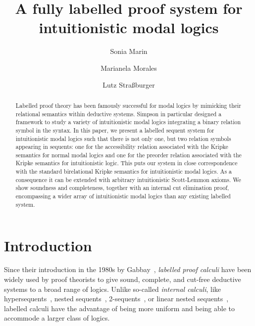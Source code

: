 \documentclass[a4paper]{article}
\title{A fully labelled proof system for intuitionistic modal logics}
\author[1]{Sonia Marin}
\author[2,3]{Marianela Morales}
\author[3,2]{Lutz Stra{\ss}burger}
\affil[1]{University College London}
\affil[2]{Laboratoire d'Informatique de l'\'Ecole Polytechnique}
\affil[3]{Inria Saclay}
\date{}
\begin{document}
  \maketitle
  
 \begin{abstract}
   Labelled proof theory has been famously successful for modal logics by mimicking their relational semantics within deductive systems. Simpson in particular designed a framework to study a variety of intuitionistic modal logics integrating a binary relation symbol in the syntax.
   In this paper, we present a labelled sequent system for
   intuitionistic modal logics such that there is not only one, but
   two relation symbols appearing in sequents: one for the accessibility
   relation associated with the Kripke semantics for normal modal logics and
   one for the preorder relation associated with the Kripke semantics
   for intuitionistic logic.
   This puts our system in close correspondence with the standard
   birelational Kripke semantics for intuitionistic modal logics. 
   As a consequence it can be extended with arbitrary intuitionistic Scott-Lemmon axioms. 
   We show soundness and completeness, together with an internal cut elimination proof, encompassing a wider array of intuitionistic modal logics than any existing labelled system.
 \end{abstract}
 
 \section{Introduction}\label{sec:intro}
 
 Since their introduction in the 1980s by Gabbay~\cite{gabbay:96},
 \emph{labelled proof calculi} have been widely used by proof theorists
 to give sound, complete, and cut-free deductive systems to a broad range
 of logics. Unlike so-called \emph{internal calculi}, like
 hypersequents~\cite{avron:elc96}, nested
 sequents~\cite{kashima:sl94,brunnler:aml09,poggiolesi:tmp09}, 
 2-sequents~\cite{masini:apal92}, or linear nested sequents~\cite{lellmann:tableaux15},
 labelled calculi have the advantage of being more uniform and being able to 
 accommode a larger class of logics.
 
\end{document}
